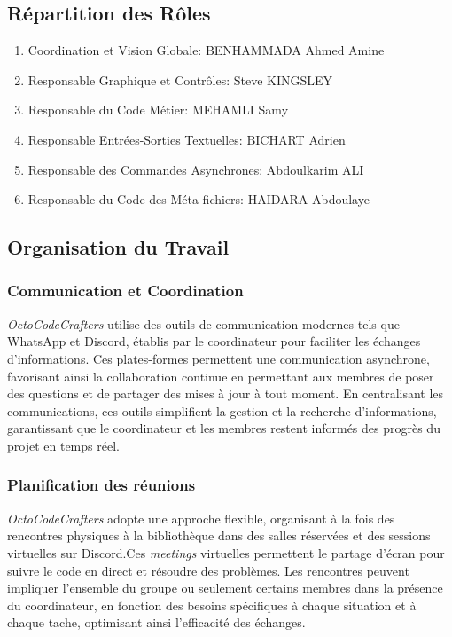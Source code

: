 \documentclass{article}
\begin{document}
\subsection{Répartition des Rôles}
\begin{enumerate}
    \item Coordination et Vision Globale: BENHAMMADA Ahmed Amine
    \item Responsable Graphique et Contrôles: Steve KINGSLEY
    \item Responsable du Code Métier: MEHAMLI Samy
    \item Responsable Entrées-Sorties Textuelles: BICHART Adrien
    \item Responsable des Commandes Asynchrones: Abdoulkarim ALI
    \item Responsable du Code des Méta-fichiers: HAIDARA Abdoulaye
\end{enumerate}
\subsection{Organisation du Travail}
\subsubsection{Communication et Coordination}
\textit{OctoCodeCrafters} utilise des outils de communication modernes tels que WhatsApp et Discord, établis par le coordinateur pour faciliter les échanges d'informations. Ces plates-formes permettent une communication asynchrone, favorisant ainsi la collaboration continue en permettant aux membres de poser des questions et de partager des mises à jour à tout moment. En centralisant les communications, ces outils simplifient la gestion et la recherche d'informations, garantissant que le coordinateur et les membres restent informés des progrès du projet en temps réel.
\subsubsection{Planification des réunions}
\textit{OctoCodeCrafters} adopte une approche flexible, organisant à la fois des rencontres physiques à la bibliothèque dans des salles réservées et des sessions virtuelles sur Discord.Ces \textit{meetings}    virtuelles permettent le partage d'écran pour suivre le code en direct et résoudre des problèmes. Les rencontres peuvent impliquer l'ensemble du groupe ou seulement certains membres dans la présence du coordinateur, en fonction des besoins spécifiques à chaque situation et à chaque tache, optimisant ainsi l'efficacité des échanges.
\end{document}
